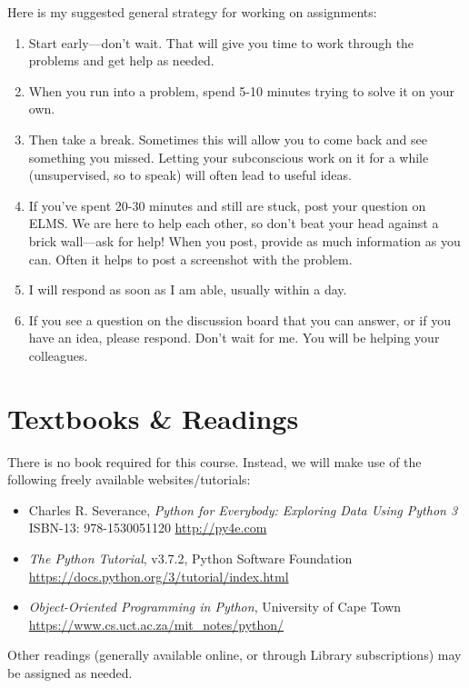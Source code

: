 \documentclass[11pt]{article}
\begin{document}
Here is my suggested general strategy for working on assignments:
\begin{enumerate}
	\item Start early–--don't wait. That will give you time to work through the problems and get help as needed.
	\item When you run into a problem, spend 5-10 minutes trying to solve it on your own.
	\item Then take a break. Sometimes this will allow you to come back and see something you missed. Letting your subconscious work on it for a while (unsupervised, so to speak) will often lead to useful ideas.
	\item If you’ve spent 20-30 minutes and still are stuck, post your question on ELMS. We are here to help each other, so don’t beat your head against a brick wall---ask for help! When you post, provide as much information as you can. Often it helps to post a screenshot with the problem.
	\item I will respond as soon as I am able, usually within a day.
	\item If you see a question on the discussion board that you can answer, or if you have an idea, please respond. Don’t wait for me. You will be helping your colleagues.
\end{enumerate}

\section{Textbooks \& Readings}
There is no book required for this course. Instead, we will make use of the following freely available websites/tutorials:
\begin{itemize}
	\item Charles R. Severance, \textit{Python for Everybody: Exploring Data Using Python 3} ISBN-13: 978-1530051120 \url{http://py4e.com}
	\item \textit{The Python Tutorial}, v3.7.2, Python Software Foundation \url{https://docs.python.org/3/tutorial/index.html}
	\item \textit{Object-Oriented Programming in Python}, University of Cape Town \url{https://www.cs.uct.ac.za/mit_notes/python/}
\end{itemize}

Other readings (generally available online, or through Library subscriptions) may be assigned as needed.
\end{document}
